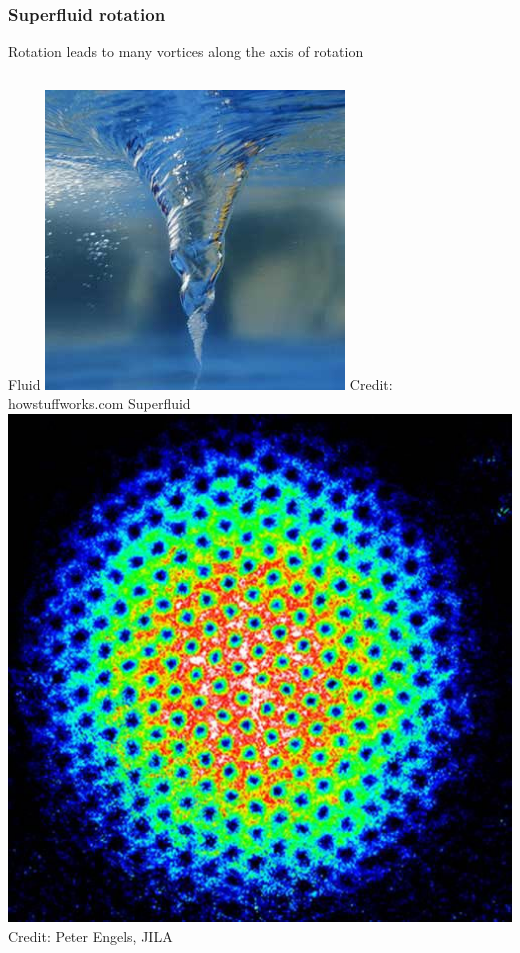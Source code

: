 \documentclass{beamer}
\begin{document}
\begin{frame}
\frametitle{Superfluid rotation}
\center Rotation leads to many vortices along the axis of rotation
\vspace{0.25cm}

\begin{columns}
Fluid
\includegraphics[width=\textwidth]{vortex.jpg}
\tiny{Credit: howstuffworks.com}
\pause
{}
Superfluid
\includegraphics[width=\textwidth]{vortexlattice.jpg}
\tiny{Credit: Peter Engels, JILA}
\end{columns}


\end{frame}
\end{document}
